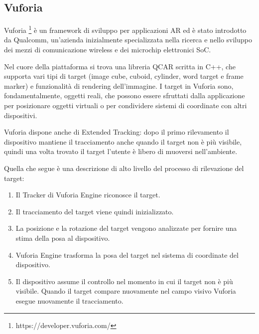 \subsection{Vuforia}
Vuforia \footnote{https://developer.vuforia.com/} è un framework di sviluppo per applicazioni AR ed è stato introdotto da Qualcomm, un'azienda inizialmente specializzata nella ricerca e nello sviluppo dei mezzi di comunicazione wireless e dei microchip elettronici SoC.

Nel cuore della piattaforma si trova una libreria QCAR scritta in C++, che supporta vari tipi di target (image cube, cuboid, cylinder, word target e frame marker) e funzionalità di rendering dell'immagine. I target in Vuforia sono, fondamentalmente, oggetti reali, che possono essere sfruttati dalla applicazione per posizionare oggetti virtuali o per condividere sistemi di coordinate con altri dispositivi.

Vuforia dispone anche di Extended Tracking: dopo il primo rilevamento il dispositivo mantiene il tracciamento anche quando il target non è più visibile, quindi una volta trovato il target l’utente è libero di muoversi nell’ambiente.

Quella che segue è una descrizione di alto livello del processo di rilevazione del target: 
\begin{enumerate}
\item Il Tracker di Vuforia Engine riconosce il target.
\item Il tracciamento del target viene quindi inizializzato. 
\item La posizione e la rotazione del target vengono analizzate per fornire una stima della posa al dispositivo. 
\item Vuforia Engine trasforma la posa del target nel sistema di coordinate del dispositivo. 
\item Il dispositivo assume il controllo nel momento in cui il target non è più visibile.
Quando il target compare nuovamente nel campo visivo Vuforia esegue nuovamente il tracciamento. 
\end{enumerate}
